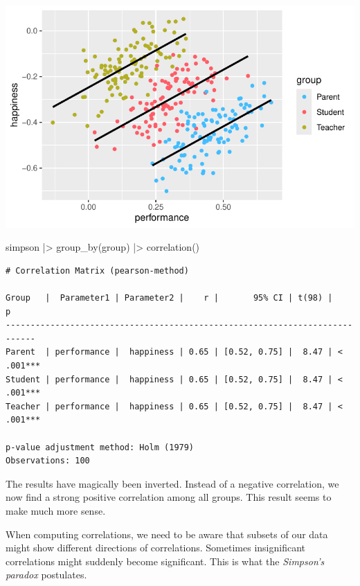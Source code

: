 \documentclass[
  letterpaper,
  DIV=11,
  numbers=noendperiod]{scrreprt}
\newenvironment{Shaded}{\begin{snugshade}}{\end{snugshade}}
\newcommand{\FunctionTok}[1]{\textcolor[rgb]{0.28,0.35,0.67}{#1}}
\newcommand{\NormalTok}[1]{\textcolor[rgb]{0.00,0.23,0.31}{#1}}
\newcommand{\SpecialCharTok}[1]{\textcolor[rgb]{0.37,0.37,0.37}{#1}}
\begin{document}
\includegraphics{10_correlations_files/figure-latex/simpson-paradox-plot-groups-1.pdf}

\begin{Shaded}
\begin{Highlighting}[]
\NormalTok{simpson }\SpecialCharTok{|\textgreater{}}
  \FunctionTok{group\_by}\NormalTok{(group) }\SpecialCharTok{|\textgreater{}}
  \FunctionTok{correlation}\NormalTok{()}
\end{Highlighting}
\end{Shaded}

\begin{verbatim}
# Correlation Matrix (pearson-method)

Group   |  Parameter1 | Parameter2 |    r |       95% CI | t(98) |         p
----------------------------------------------------------------------------
Parent  | performance |  happiness | 0.65 | [0.52, 0.75] |  8.47 | < .001***
Student | performance |  happiness | 0.65 | [0.52, 0.75] |  8.47 | < .001***
Teacher | performance |  happiness | 0.65 | [0.52, 0.75] |  8.47 | < .001***

p-value adjustment method: Holm (1979)
Observations: 100
\end{verbatim}

The results have magically been inverted. Instead of a negative
correlation, we now find a strong positive correlation among all groups.
This result seems to make much more sense.

When computing correlations, we need to be aware that subsets of our
data might show different directions of correlations. Sometimes
insignificant correlations might suddenly become significant. This is
what the \emph{Simpson's paradox} postulates.
\end{document}
